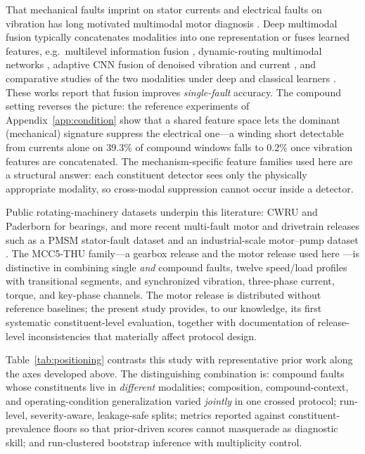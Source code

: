 That mechanical faults imprint on stator currents and electrical faults on
vibration has long motivated multimodal motor diagnosis
\cite{mcsa_review2017}. Deep multimodal fusion typically concatenates
modalities into one representation or fuses learned features, e.g.\
multilevel information fusion \cite{multilevel2019}, dynamic-routing
multimodal networks \cite{drmnn2020}, adaptive CNN fusion of denoised
vibration and current \cite{plos2025}, and comparative studies of the two
modalities under deep and classical learners \cite{ayankoso2026}. These
works report that fusion improves \emph{single-fault} accuracy. The
compound setting reverses the picture: the reference experiments of
Appendix~\ref{app:condition} show that a shared feature space lets the
dominant (mechanical) signature suppress the electrical one---a winding
short detectable from currents alone on 39.3\% of compound windows falls to
0.2\% once vibration features are concatenated. The mechanism-specific feature families used here are a
structural answer: each constituent detector sees only the physically
appropriate modality, so cross-modal suppression cannot occur inside a
detector.

Public rotating-machinery datasets underpin this literature: CWRU
\cite{smith2015cwru} and Paderborn \cite{lessmeier2016} for bearings, and
more recent multi-fault motor and drivetrain releases such as a PMSM
stator-fault dataset \cite{jung2023} and an industrial-scale motor--pump
dataset \cite{bruinsma2024}. The MCC5-THU family---a gearbox release
\cite{chen2024gearbox} and the motor release used here \cite{chen2026}---is
distinctive in combining single \emph{and} compound faults, twelve
speed/load profiles with transitional segments, and synchronized vibration,
three-phase current, torque, and key-phase channels. The motor release is
distributed without reference baselines; the present study provides, to our
knowledge, its first systematic constituent-level evaluation, together with
documentation of release-level inconsistencies that materially affect
protocol design.

Table~\ref{tab:positioning} contrasts this study with representative prior
work along the axes developed above. The distinguishing combination is:
compound faults whose constituents live in \emph{different} modalities;
composition, compound-context, and operating-condition generalization
varied \emph{jointly} in one crossed protocol; run-level, severity-aware,
leakage-safe splits; metrics reported against constituent-prevalence floors
so that prior-driven scores cannot masquerade as diagnostic skill; and
run-clustered bootstrap inference with multiplicity control.

